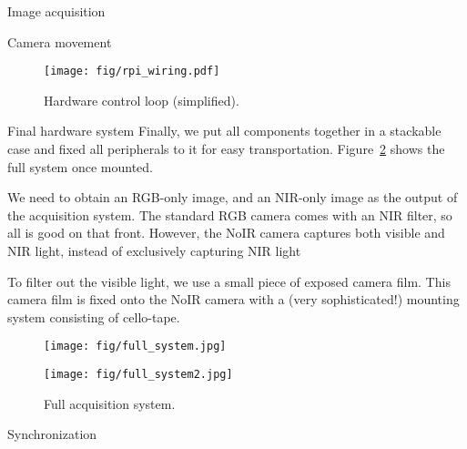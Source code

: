 \documentclass[10pt]{article}
\begin{document}
\begin{section}{Image acquisition}
\begin{subsubsection}{Camera movement}
        \begin{figure}[!h]
            \begin{center}
                \texttt{[image: fig/rpi\_wiring.pdf]}
                \caption{Hardware control loop (simplified).}
                \label{fig:servomotor_control_loop}
            \end{center}
        \end{figure}
    \end{subsubsection}

    \begin{subsubsection}{Final hardware system}
        Finally, we put all components together in a stackable case and fixed all peripherals to it for easy transportation. Figure~\ref{fig:full_system} shows the full system once mounted.

        \medskip

        We need to obtain an RGB-only image, and an NIR-only image as the output of the acquisition system. The standard RGB camera comes with an NIR filter, so all is good on that front. However, the NoIR camera captures both visible and NIR light, instead of exclusively capturing NIR light

        \medskip

        To filter out the visible light, we use a small piece of exposed camera film. This camera film is fixed onto the NoIR camera with a (very sophisticated!) mounting system consisting of cello-tape.

        \begin{figure}[!h]
            \centering
            \begin{minipage}[b]{0.45\textwidth}
                \texttt{[image: fig/full\_system.jpg]}
            \end{minipage} \hspace{0.5em} %
            \begin{minipage}[b]{0.45\textwidth}
                \texttt{[image: fig/full\_system2.jpg]}
            \end{minipage}
            \caption{Full acquisition system.}
            \label{fig:full_system}
        \end{figure}

    \end{subsubsection}

    \begin{subsection}{Synchronization}
        \label{sec:synchronization}
    \end{subsection} %


\end{section}
\end{document}
